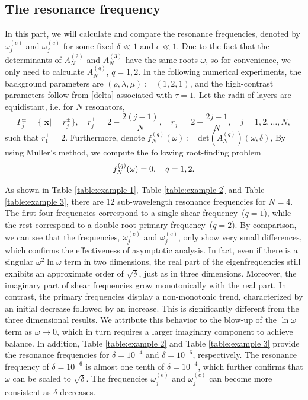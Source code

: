 \documentclass[10pt,reqno,oneside]{amsart}%
\theoremstyle{definition}
\theoremstyle{remark}
\numberwithin{equation}{section}
\numberwithin{equation}{section}
\begin{document}
\subsection{The resonance frequency}In this part, we will calculate and compare the resonance frequencies, denoted by $\omega_j^{(e)}$ and $\omega_j^{(c)}$ for some fixed $\delta\ll 1$ and $\epsilon\ll 1$. Due to the fact that the determinants of $A_N^{(2)}$ and $A_N^{(3)}$ have the same roots $\omega$, so for convenience, we only need to calculate $A_N^{(q)}$, $q=1,2$. In the following numerical experiments, the background parameters are $(\rho,\lambda,\mu):=(1,2,1)$, and the high-contrast parameters follow from \eqref{delta} associated with $\tau=1$. Let the radii of layers are equidistant, i.e. for $N$ resonators,
\begin{equation}\label{radii1}
\Gamma_j^{\pm}=\{|\mathbf{x}|=r_{j}^{\pm}\},\quad r_j^{+}=2-\frac{2(j-1)}{N},\quad r_j^{-}=2-\frac{2j-1}{N},\quad j=1,2,\dots,N,
\end{equation}
such that $r_1^{+}=2$. Furthermore, denote $f^{(q)}_N(\omega):=\text{det}(A_N^{(q)})(\omega,\delta)$, By using Muller's method, we compute the following root-finding problem
\begin{equation}
	f^{(q)}_N(\omega)=0,\quad q=1,2. \notag
\end{equation}

As shown in Table \ref{table:example 1}, Table \ref{table:example 2} and Table \ref{table:example 3}, there are 12 sub-wavelength resonance frequencies for $N =4$. The first four frequencies correspond to a single shear frequency~($q=1$), while the rest correspond to a double root primary frequency~($q=2$). By comparison, we can see that the frequencies, $\omega_j^{(e)}$ and $\omega_j^{(c)}$, only show very small differences, which confirms the effectiveness of asymptotic analysis. In fact, even if there is a singular $ \omega^2\ln \omega$ term in two dimensions, the real part of the eigenfrequencies still exhibits an approximate order of $\sqrt{\delta}$, just as in three dimensions. Moreover, the imaginary part of shear frequencies grow monotonically with the real part. In contrast, the primary frequencies display a non-monotonic trend, characterized by an initial decrease followed by an increase. This is significantly different from the three dimensional results. We attribute this behavior to the blow-up of the $\ln \omega$ term as $\omega \to 0$, which in turn requires a larger imaginary component to achieve balance. In addition, Table \ref{table:example 2} and Table \ref{table:example 3} provide the resonance frequencies for $\delta=10^{-4}$ and $\delta=10^{-6}$, respectively. The resonance frequency of $\delta=10^{-6}$ is almost one tenth of $\delta=10^{-4} $, which further confirms that $\omega$ can be scaled to $\sqrt{\delta}$. The frequencies $\omega_j^{(e)}$ and $\omega_j^{(c)}$ can become more consistent as $\delta$ decreases.
\end{document}

